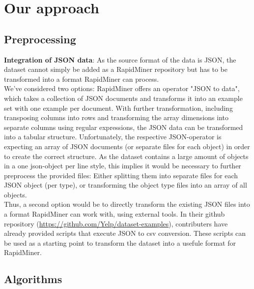 \section{Our approach} %
\label{cha:approach}

\subsection{Preprocessing}
\label{sec:preprocessing}
\textbf{Integration of JSON data}: As the source format of the data is JSON, %
the dataset cannot simply be added as a RapidMiner repository but has to be transformed into a format RapidMiner can process.\\
We've considered two options: RapidMiner offers an operator "JSON to data", which takes a collection of JSON documents and transforms it into an example set with one example per document. With further transformation, including transposing columns into rows and transforming the array dimensions into separate columns using regular expressions, the JSON data can be transformed into a tabular structure. Unfortunately, the respective JSON-operator is expecting an array of JSON documents (or separate files for each object) in order to create the correct structure. As the dataset contains a large amount of objects in a one json-object per line style, this implies it would be necessary to further preprocess the provided files: Either splitting them into separate files for each JSON object (per type), or transforming the object type files into an array of all objects.\\
Thus, a second option would be to directly transform the existing JSON files into a format RapidMiner can work with, using external tools. In their github repository (\url{https://github.com/Yelp/dataset-examples}), contributers have already provided scripts that execute JSON to csv conversion. These scripts can be used as a starting point to transform the dataset into a usefule format for RapidMiner. %


\subsection{Algorithms}
\label{sec:algorithms}